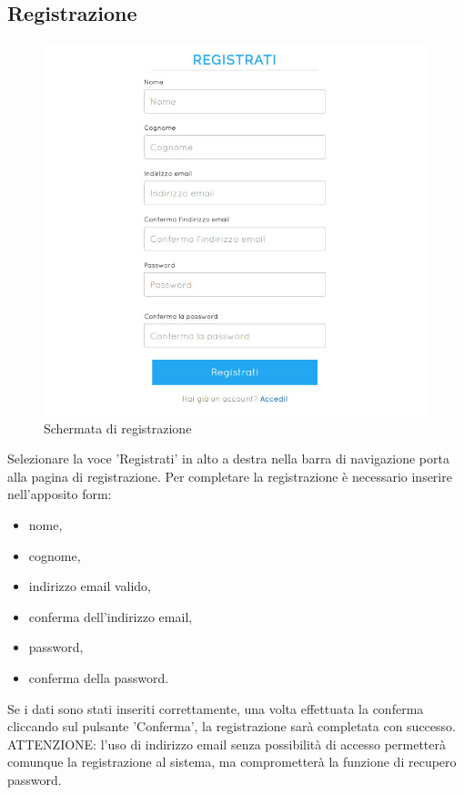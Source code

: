 \documentclass[a4paper, titlepage]{article}
\begin{document}
	\newpage
	\subsection{Registrazione}
	\begin{figure}[!h]
		\centering
		\includegraphics[scale=0.5]{Img/screen_Registrazione.png}
		\caption{Schermata di registrazione}
	\end{figure}
	Selezionare la voce 'Registrati' in alto a destra nella barra di navigazione porta alla pagina di registrazione.
	Per completare la registrazione è necessario inserire nell'apposito form:
	\begin{itemize}
		\item nome,
		\item cognome,
		\item indirizzo email valido,
		\item conferma dell'indirizzo email,
		\item password,
		\item conferma della password.
	\end{itemize}
	Se i dati sono stati inseriti correttamente, una volta effettuata la conferma cliccando sul pulsante 'Conferma', la registrazione sarà completata con successo.
	ATTENZIONE: l'uso di indirizzo email senza possibilità di accesso permetterà comunque la registrazione al sistema, ma comprometterà la funzione di recupero password.
\end{document}
